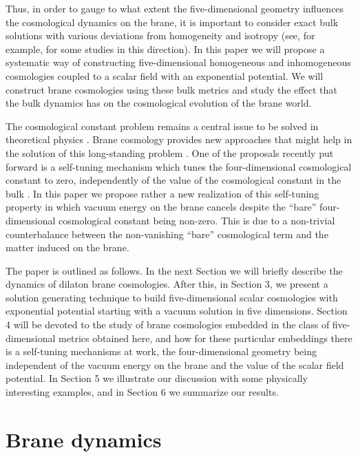 \documentclass[prd,a4paper,twocolumn,superscriptaddress,nofootinbib,showpacs]{revtex4}
\begin{document}
Thus, in order to gauge to what extent the five-dimensional geometry influences the cosmological
dynamics on the brane, it is important to consider exact bulk solutions with various deviations
from homogeneity and isotropy (see, for example, \cite{hlz,fr,csop} for some 
studies in this direction). In this paper we will propose a systematic way of constructing
five-dimensional homogeneous and 
inhomogeneous cosmologies coupled to a  scalar field with an exponential 
potential. We will construct brane cosmologies using these bulk metrics and study the effect
that the bulk dynamics has
on the cosmological evolution of the brane world. 

The cosmological constant problem remains a central issue to be solved in theoretical physics
\cite{wein}.
Brane cosmology provides new approaches that might help in the solution of this long-standing
problem \cite{strau}. One of the proposals recently put forward is a self-tuning mechanism which tunes the
four-dimensional cosmological constant to zero, independently of the value of the cosmological
constant in the bulk \cite{kach,kachh,nem,cm}. 
In this paper we propose rather a new realization of this self-tuning
property in which vacuum energy on the brane cancels despite the ``bare'' four-dimensional
cosmological constant being non-zero. This is due to a non-trivial counterbalance between
the non-vanishing ``bare'' cosmological term and the matter induced on the brane.

The paper is outlined as follows. In the next Section we will briefly describe the dynamics of 
dilaton brane cosmologies. After this, in Section 3, we  present a solution generating 
technique to build five-dimensional scalar cosmologies with exponential potential 
starting with a vacuum solution in five dimensions.
Section 4 will be devoted to the study of brane cosmologies embedded in the class of five-dimensional
metrics obtained here, and how for these particular embeddings there is a self-tuning mechanisms at
work, the four-dimensional geometry being independent of the vacuum energy on the brane and the
value of the scalar field potential. In Section 5 we illustrate our discussion with some physically 
interesting examples, and in Section 6 we summarize our results. 


\section{Brane dynamics}
\end{document}
